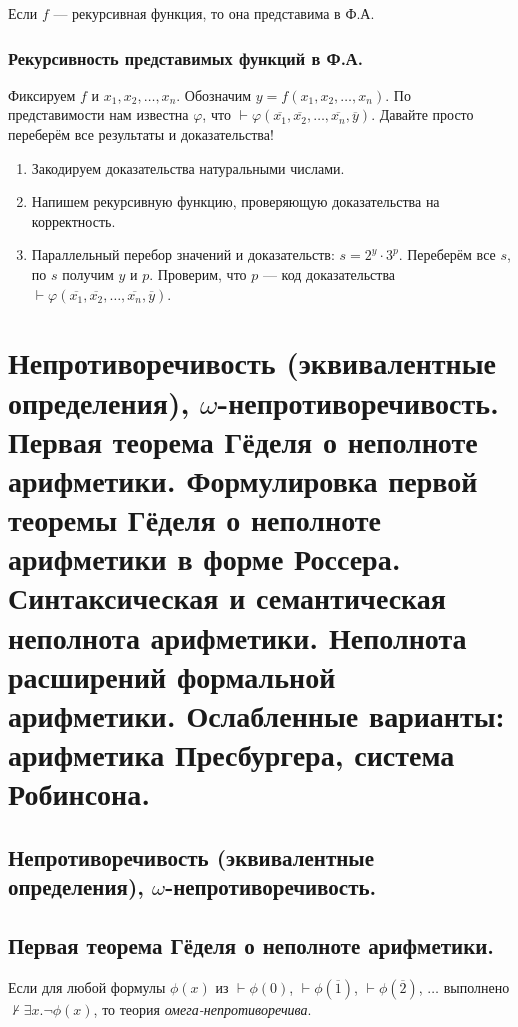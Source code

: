 \documentclass[10pt,a4paper,oneside]{article}
\begin{document}
 Если $f$ --- рекурсивная функция, то она представима
в Ф.А.


\subsubsection{Рекурсивность представимых функций в Ф.А.}
Фиксируем $f$ и $x_1, x_2, \dots, x_n$. Обозначим $y = f(x_1,x_2,\dots,x_n)$.
По представимости нам известна $\varphi$, что $\vdash \varphi(\overline{x_1},\overline{x_2},\dots,\overline{x_n},\overline{y})$.
Давайте просто переберём все результаты и доказательства!

\begin{enumerate}
\item Закодируем доказательства натуральными числами.
\item Напишем рекурсивную функцию, проверяющую доказательства на корректность.
\item Параллельный перебор значений и доказательств: $s = 2^y \cdot 3^p$. Переберём все $s$, по $s$ получим $y$ и $p$.
Проверим, что $p$ --- код доказательства $\vdash \varphi(\overline{x_1},\overline{x_2},\dots,\overline{x_n},\overline{y})$.
\end{enumerate}

\section{Непротиворечивость (эквивалентные определения), $\omega$-не\-про\-ти\-во\-ре\-чи\-вость. 
Первая теорема Гёделя о неполноте арифметики.
Формулировка первой теоремы Гёделя о неполноте арифметики в форме Россера. 
Синтаксическая и семантическая неполнота арифметики.
Неполнота расширений формальной арифметики.
Ослабленные варианты: арифметика Пресбургера, система Робинсона.}

\subsection{Непротиворечивость (эквивалентные определения), $\omega$-не\-про\-ти\-во\-ре\-чи\-вость.}

\subsection{Первая теорема Гёделя о неполноте арифметики.}
 Если для любой формулы $\phi(x)$ из $\vdash\phi(0)$, $\vdash\phi(\overline{1})$,
$\vdash\phi(\overline{2})$, $\dots$ выполнено $\not\vdash\exists x.\neg\phi(x)$, 
то теория \emph{омега-непротиворечива}.
\end{document}

